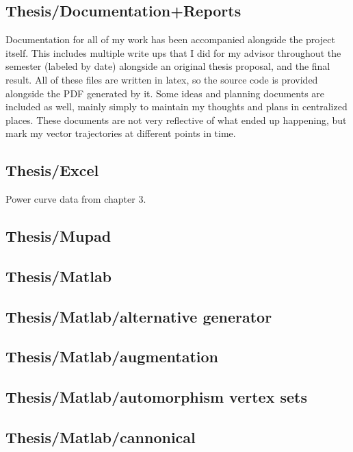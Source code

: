 \subsection{Thesis/Documentation+Reports}

Documentation for all of my work has been accompanied alongside the project itself.
This includes multiple write ups that I did for my advisor throughout the semester (labeled by date) alongside an original thesis proposal, and the final result.
All of these files are written in latex, so the source code is provided alongside the PDF generated by it. 
Some ideas and planning documents are included as well, mainly simply to maintain my thoughts and plans in centralized places.
These documents are not very reflective of what ended up happening, but mark my vector trajectories at different points in time.

\subsection{Thesis/Excel}

Power curve data from chapter 3.

\subsection{Thesis/Mupad}

\subsection{Thesis/Matlab}

\subsection*{Thesis/Matlab/alternative generator}

\subsection*{Thesis/Matlab/augmentation}

\subsection*{Thesis/Matlab/automorphism vertex sets}

\subsection*{Thesis/Matlab/cannonical}

